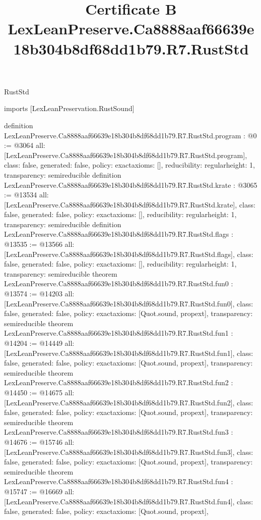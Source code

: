 \begin{lexlean}{RustStd}
\title{Certificate B LexLeanPreserve.Ca8888aaf66639e18b304b8df68dd1b79.R7.RustStd}
\begin{coremodule}
imports [LexLeanPreservation.RustSound]

definition LexLeanPreserve.Ca8888aaf66639e18b304b8df68dd1b79.R7.RustStd.program : @0 := @3064 {
  all: [LexLeanPreserve.Ca8888aaf66639e18b304b8df68dd1b79.R7.RustStd.program],
  class: false,
  generated: false,
  policy: exact{axioms: []},
  reducibility: regular{height: 1},
  transparency: semireducible
}
definition LexLeanPreserve.Ca8888aaf66639e18b304b8df68dd1b79.R7.RustStd.krate : @3065 := @13534 {
  all: [LexLeanPreserve.Ca8888aaf66639e18b304b8df68dd1b79.R7.RustStd.krate],
  class: false,
  generated: false,
  policy: exact{axioms: []},
  reducibility: regular{height: 1},
  transparency: semireducible
}
definition LexLeanPreserve.Ca8888aaf66639e18b304b8df68dd1b79.R7.RustStd.flags : @13535 := @13566 {
  all: [LexLeanPreserve.Ca8888aaf66639e18b304b8df68dd1b79.R7.RustStd.flags],
  class: false,
  generated: false,
  policy: exact{axioms: []},
  reducibility: regular{height: 1},
  transparency: semireducible
}
theorem LexLeanPreserve.Ca8888aaf66639e18b304b8df68dd1b79.R7.RustStd.fun0 : @13574 := @14203 {
  all: [LexLeanPreserve.Ca8888aaf66639e18b304b8df68dd1b79.R7.RustStd.fun0],
  class: false,
  generated: false,
  policy: exact{axioms: [Quot.sound, propext]},
  transparency: semireducible
}
theorem LexLeanPreserve.Ca8888aaf66639e18b304b8df68dd1b79.R7.RustStd.fun1 : @14204 := @14449 {
  all: [LexLeanPreserve.Ca8888aaf66639e18b304b8df68dd1b79.R7.RustStd.fun1],
  class: false,
  generated: false,
  policy: exact{axioms: [Quot.sound, propext]},
  transparency: semireducible
}
theorem LexLeanPreserve.Ca8888aaf66639e18b304b8df68dd1b79.R7.RustStd.fun2 : @14450 := @14675 {
  all: [LexLeanPreserve.Ca8888aaf66639e18b304b8df68dd1b79.R7.RustStd.fun2],
  class: false,
  generated: false,
  policy: exact{axioms: [Quot.sound, propext]},
  transparency: semireducible
}
theorem LexLeanPreserve.Ca8888aaf66639e18b304b8df68dd1b79.R7.RustStd.fun3 : @14676 := @15746 {
  all: [LexLeanPreserve.Ca8888aaf66639e18b304b8df68dd1b79.R7.RustStd.fun3],
  class: false,
  generated: false,
  policy: exact{axioms: [Quot.sound, propext]},
  transparency: semireducible
}
theorem LexLeanPreserve.Ca8888aaf66639e18b304b8df68dd1b79.R7.RustStd.fun4 : @15747 := @16669 {
  all: [LexLeanPreserve.Ca8888aaf66639e18b304b8df68dd1b79.R7.RustStd.fun4],
  class: false,
  generated: false,
  policy: exact{axioms: [Quot.sound, propext]},
}
\end{coremodule}
\end{lexlean}
